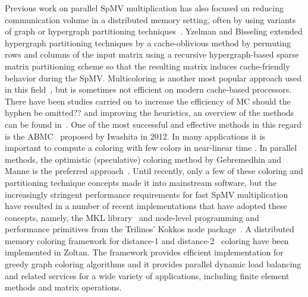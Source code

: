 Previous work on parallel SpMV multiplication has also focused on reducing communication volume in a distributed memory setting, often by using variants of graph or hypergraph partitioning techniques~\cite{Catalyurek:1999}. Yzelman and Bisseling \cite{doi:10.1137/080733243,Yzelman-thesis-2011} extended hypergraph partitioning techniques by a cache-oblivious method by permuting rows and columns of the input matrix using a recursive hypergraph-based sparse matrix partitioning scheme so that the resulting matrix induces cache-friendly behavior during the SpMV. Multicoloring is another most popular approach used in this field~\cite{MC}, but is sometimes not efficient on modern cache-based processors. There have been studies carried on to increase the efficiency of \acrfull{MC} {\CA should the hyphen be omitted??} and improving the heuristics, an overview of the methods can be found in~\cite{dist_k_def,COLPACK,equitable_color}. One of the most successful and effective methods in this regard is the \acrfull{ABMC}~\cite{ABMC} proposed by Iwashita \etal in 2012. In many applications it is important to compute a coloring with few colors in near-linear time \cite{doi:10.1137/13093426X}. In parallel methods, the optimistic (speculative) coloring method by Gebremedhin and Manne \cite{gebremedhin2000scalable} is the preferred approach~\cite{Boman:2016}. 
Until recently, only a few of these coloring and partitioning technique concepts made it into mainstream software, but the increasingly stringent performance requirements for fast SpMV multiplication have resulted in a number of recent implementations that have adopted these concepts, namely, the \acrshort{MKL} library~\cite{MKL} and node-level programming and performance primitives from the Trilinos’ Kokkos node package~\cite{kokkos}. A distributed memory coloring framework for distance-1\cite{BOZDAG2008515} and distance-2~\cite{doi:10.1137/080732158} coloring have been implemented in Zoltan. The framework provides efficient implementation for greedy graph coloring algorithms and it provides parallel dynamic load balancing and related services for a wide variety of applications, including finite element methods and matrix operations.


